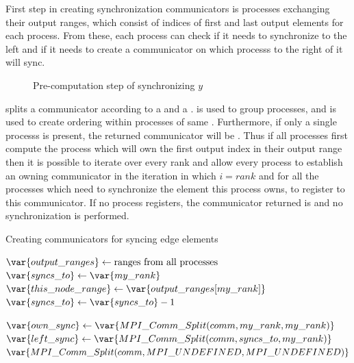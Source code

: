 \documentclass[thesis=M,english]{FITthesis}[2019/12/23]
\begin{document}
First step in creating synchronization communicators is processes exchanging their output ranges,
which consist of indices of first and last output elements for each process. From
these, each process can check if it needs to synchronize to the left and if it needs to
create a communicator on which processs to the right of it will sync.

\begin{figure}[htp]
    \centering
    \caption{Pre-computation step of synchronizing \(y\)}
\end{figure}

 splits a communicator according to a  and a .
 is used to group processes, and  is used to create ordering within processes
of same . Furthermore, if only a single processs is present, the
returned communicator will be . Thus if all processes first compute the
process which will own the first output index in their output range then it is possible
to iterate over every rank and allow every process to establish an owning communicator
in the iteration in which \(i = rank\) and for all the processes which need to synchronize
the element this process owns, to register to this communicator. If no process registers,
the communicator returned is  and no
synchronization is performed.

\begin{algorithm}[htp]
    \caption{Creating communicators for syncing edge elements}
    \begin{algorithmic}
        \State $\var{output\_ranges} \gets \text{ranges from all processes}$
        \State $\var{syncs\_to} \gets \var{my\_rank}$
        \State $\var{this\_node\_range} \gets \var{output\_ranges[my\_rank]}$
        \State $\var{syncs\_to} \gets \var{syncs\_to} - 1$
        \EndWhile

        \State $\var{own\_sync} \gets \var{MPI\_Comm\_Split(comm, my\_rank, my\_rank)}$
        \State $\var{left\_sync} \gets \var{MPI\_Comm\_Split(comm, syncs\_to, my\_rank)}$
        \Else {}
        \State $\var{MPI\_Comm\_Split(comm, MPI\_UNDEFINED, MPI\_UNDEFINED)}$
        \EndIf
        \EndFor
        \EndFunction
    \end{algorithmic}
\end{algorithm}
\end{document}
